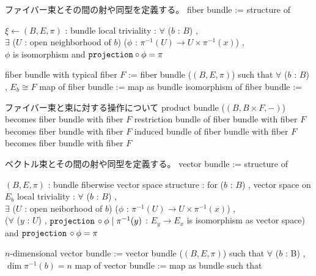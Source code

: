 \begin{Definition}
\itemnote
  ファイバー束とその間の射や同型を定義する。
\itemdefi
  \Define fiber bundle := structure of
  \begin{itemize}
    \itembase \(\xi \leftarrow (B , E , \pi)\) : bundle
    \itemwith local triviality :
      \(\forall\) (\(b\) : \(B\)) ,\\
      \(\exists\) (\(U\) : open neighborhood of \(b\)) (\(\phi\) : \(\pi^{-1}(U) \to U \times \pi^{-1}(x)\)) , \\
      \(\phi\) is isomorphism and \(\texttt{projection} \circ \phi = \pi\)
  \end{itemize}
\itemdefi
  \Define fiber bundle with typical fiber \(F\) := fiber bundle (\((B , E , \pi)\)) such that \(\forall\) (\(b\) : \(B\)) , \(E_b \cong F\)
\itemdefi
  \Define map of fiber bundle := map as bundle
\itemdefi
  \Define isomorphism of fiber bundle := 
\end{Definition}

\begin{Theorem}
\itemnote
  ファイバー束と束に対する操作について
\itemprop
  product bundle (\((B , B \times F , -)\)) becomes fiber bundle with fiber \(F\)
\itemprop
  restriction bundle of fiber bundle with fiber \(F\) becomes fiber bundle with fiber \(F\)
\itemprop
  induced bundle of fiber bundle with fiber \(F\) becomes fiber bundle with fiber \(F\)
\end{Theorem}

\begin{Definition}
\itemnote
  ベクトル束とその間の射や同型を定義する。
\itemdefi
  \Define vector bundle := structure of
  \begin{itemize}
    \itembase \((B , E , \pi)\) : bundle
    \itemenum fiberwise vector space structure :
      for (\(b\) : \(B\)) , vector space on \(E_b\)
    \itemwith local triviality :
      \(\forall\) (\(b\) : \(B\)) ,\\
      \(\exists\) (\(U\) : open neiborhood of \(b\)) (\(\phi\) : \(\pi^{-1}(U) \to U \times \pi^{-1}(x)\)) , \\
      (\(\forall\) (\(y\) : \(U\)) , \(\texttt{projection} \, \circ \phi \mid \pi^{-1}(y)\) : \(E_y \to E_x\) is isomorphism as vector space) and \(\texttt{projection} \, \circ \phi = \pi\)
  \end{itemize}
\itemdefi
  \Define \(n\)-dimensional vector bundle :=
  vector bundle (\((B , E , \pi)\)) such that \(\forall\) (\(b\) : B) , \(\dim \pi^{-1}(b) = n\)
\itemdefi
  \Define map of vector bundle := map as bundle such that 
\end{Definition}

